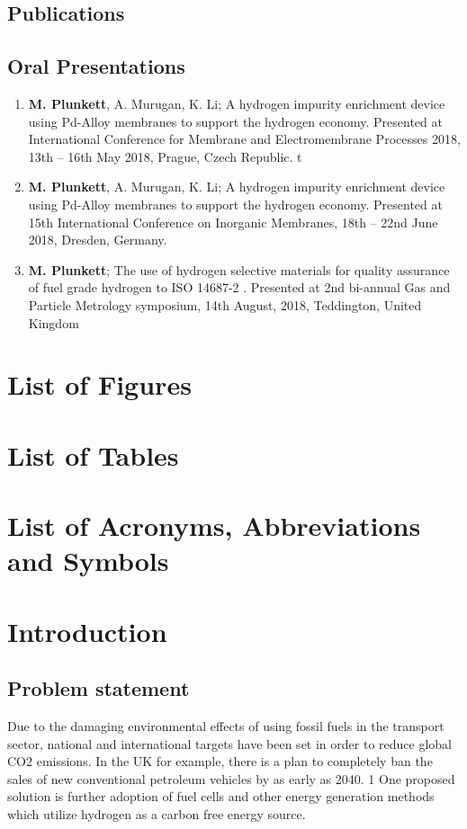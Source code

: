 \documentclass{report}
\begin{document}
\section*{Publications}

\section*{Oral Presentations}
\begin{enumerate}
    \item \textbf{M. Plunkett}, A. Murugan, K. Li; A hydrogen impurity enrichment device using Pd-Alloy membranes to support the hydrogen economy. Presented at International Conference for Membrane and Electromembrane Processes 2018, 13th – 16th May 2018, Prague, Czech Republic. t
    \item \textbf{M. Plunkett}, A. Murugan, K. Li; A hydrogen impurity enrichment device using Pd-Alloy membranes to support the hydrogen economy. Presented at 15th International Conference on Inorganic Membranes, 18th – 22nd June 2018, Dresden, Germany. 
    \item \textbf{M. Plunkett}; The use of hydrogen selective materials for quality assurance of fuel grade hydrogen to ISO 14687-2 . Presented at 2nd bi-annual Gas and Particle Metrology symposium, 14th August, 2018, Teddington, United Kingdom 
\end{enumerate}

\chapter*{List of Figures}

\chapter*{List of Tables}

\chapter*{List of Acronyms, Abbreviations and Symbols}


\tableofcontents



\chapter{Introduction}
\section{Problem statement}
Due to the damaging environmental effects of using fossil fuels in the transport sector, national and international targets have been set in order to reduce global CO2 emissions. In the UK for example, there is a plan to completely ban the sales of new conventional petroleum vehicles by as early as 2040. 1 One proposed solution is further adoption of fuel cells and other energy generation methods which utilize hydrogen as a carbon free energy source. 
\end{document}
